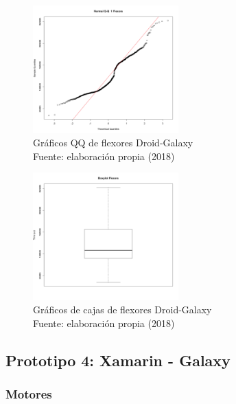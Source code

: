 \begin{figure}[H]
  \begin{center} 
   	\includegraphics[width=0.5\textwidth]{evaluation/graphics/Droid/Galaxy/NormalQQFlexorsDroidGalaxy.png} 
    \caption[Gráfico QQ de flexores Droid-Galaxy]{Gráficos QQ de flexores Droid-Galaxy\\Fuente: elaboración propia (2018)} 
    \label{fig:droid-galaxy-QQ-flexors}
  \end{center}
\end{figure}

\begin{figure}[H]
  \begin{center} 
   	\includegraphics[width=0.5\textwidth]{evaluation/graphics/Droid/Galaxy/BoxplotFlexorsDroidGalaxy.png} 
    \caption[Gráficos de cajas de flexores Droid-Galaxy]{Gráficos de cajas de flexores Droid-Galaxy\\Fuente: elaboración propia (2018)} 
    \label{fig:droid-galaxy-boxplot-flexors}
  \end{center}
\end{figure}


\subsection{Prototipo 4: Xamarin - Galaxy}

\subsubsection{Motores}

